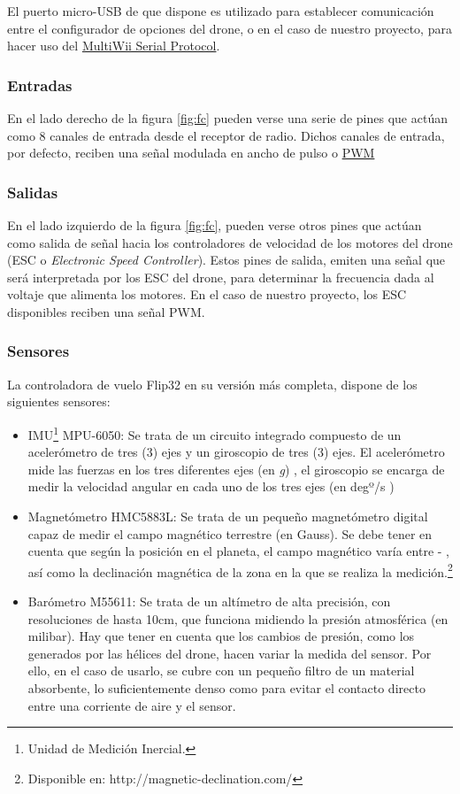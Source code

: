 El puerto micro-USB de que dispone es utilizado para establecer comunicación entre el configurador de opciones del drone, o en el caso de nuestro proyecto, para hacer uso del \hyperref[subsec:MSP]{MultiWii Serial Protocol}. 


\subsubsection{Entradas}
En el lado derecho de la figura \ref{fig:fc} pueden verse una serie de pines que actúan como 8 canales de entrada desde el receptor de radio.
Dichos canales de entrada, por defecto, reciben una señal modulada en ancho de pulso o \hyperref[subsec:PWM]{PWM}

 

\subsubsection{Salidas}
En el lado izquierdo de la figura \ref{fig:fc}, pueden verse otros pines que actúan como salida de señal hacia los controladores de velocidad de los motores del drone (ESC o \textit{Electronic Speed Controller}).
Estos pines de salida, emiten una señal que será interpretada por los ESC del drone, para determinar la frecuencia dada al voltaje que alimenta los motores. En el caso de nuestro proyecto, los ESC disponibles reciben una señal PWM.

\newpage
\subsubsection{Sensores}
\label{subsubsec:sensors}
La controladora de vuelo Flip32 en su versión más completa, dispone de los siguientes sensores:
\begin{itemize}
\item IMU\footnote{Unidad de Medición Inercial.} MPU-6050: Se trata de un circuito integrado compuesto de un acelerómetro de tres (3) ejes y un giroscopio de tres (3) ejes. El acelerómetro mide las fuerzas en los tres diferentes ejes (en \textit{g}) , el giroscopio se encarga de medir la velocidad angular en cada uno de los tres ejes (en degº/s )
\item Magnetómetro HMC5883L: Se trata de un pequeño magnetómetro digital capaz de medir el campo magnético terrestre (en Gauss). Se debe tener en cuenta que según la posición en el planeta, el campo magnético varía entre \si{} - \si{}, así como la declinación magnética de la zona en la que se realiza la medición.\footnote{Disponible en: http://magnetic-declination.com/}
\item Barómetro M55611: Se trata de un altímetro de alta precisión, con resoluciones de hasta 10cm, que funciona midiendo la presión atmosférica (en milibar). Hay que tener en cuenta que los cambios de presión, como los generados por las hélices del drone, hacen variar la medida del sensor. Por ello, en el caso de usarlo, se cubre con un pequeño filtro de un material absorbente, lo suficientemente denso como para evitar el contacto directo entre una corriente de aire y el sensor.
\end{itemize}

